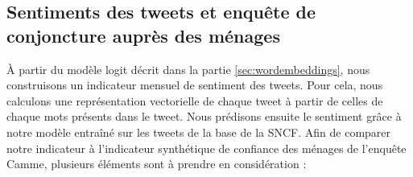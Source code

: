 \documentclass[11pt,french,french]{article}
\begin{document}
\hypertarget{sentiments-des-tweets-et-enquuxeate-de-conjoncture-aupruxe8s-des-muxe9nages}{%
\subsection{Sentiments des tweets et enquête de conjoncture auprès des ménages}\label{sentiments-des-tweets-et-enquuxeate-de-conjoncture-aupruxe8s-des-muxe9nages}}

À partir du modèle logit décrit dans la partie \ref{sec:wordembeddings}, nous construisons un indicateur mensuel de sentiment des tweets.
Pour cela, nous calculons une représentation vectorielle de chaque tweet à partir de celles de chaque mots présents dans le tweet.
Nous prédisons ensuite le sentiment grâce à notre modèle entraîné sur les tweets de la base de la SNCF.
Afin de comparer notre indicateur à l'indicateur synthétique de confiance des ménages de l'enquête Camme, plusieurs éléments sont à prendre en considération :
\end{document}
